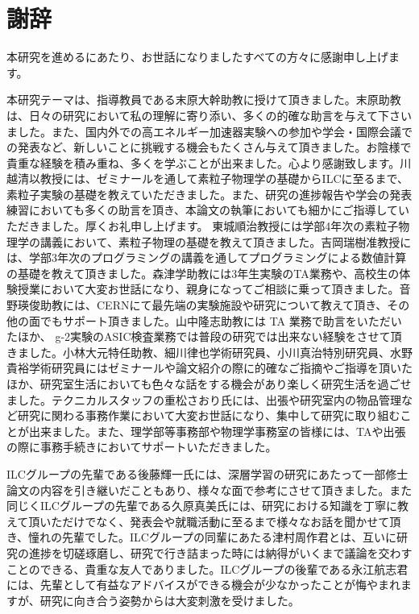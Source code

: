 
\clearpage

\chapter*{謝辞} \label{sec:Acknowledgement}
本研究を進めるにあたり、お世話になりましたすべての方々に感謝申し上げます。

本研究テーマは、指導教員である末原大幹助教に授けて頂きました。末原助教は、日々の研究において私の理解に寄り添い、多くの的確な助言を与えて下さいました。また、国内外での高エネルギー加速器実験への参加や学会・国際会議での発表など、新しいことに挑戦する機会もたくさん与えて頂きました。お陰様で貴重な経験を積み重ね、多くを学ぶことが出来ました。心より感謝致します。川越清以教授には、ゼミナールを通して素粒子物理学の基礎からILCに至るまで、素粒子実験の基礎を教えていただきました。また、研究の進捗報告や学会の発表練習においても多くの助言を頂き、本論文の執筆においても細かにご指導していただきました。厚くお礼申し上げます。
東城順治教授には学部4年次の素粒子物理学の講義において、素粒子物理の基礎を教えて頂きました。吉岡瑞樹准教授には、学部3年次のプログラミングの講義を通してプログラミングによる数値計算の基礎を教えて頂きました。森津学助教には3年生実験のTA業務や、高校生の体験授業において大変お世話になり、親身になってご相談に乗って頂きました。音野瑛俊助教には、CERNにて最先端の実験施設や研究について教えて頂き、その他の面でもサポート頂きました。山中隆志助教には TA 業務で助言をいただいたほか、 g-2実験のASIC検査業務では普段の研究では出来ない経験をさせて頂きました。小林大元特任助教、細川律也学術研究員、小川真治特別研究員、水野貴裕学術研究員にはゼミナールや論文紹介の際に的確なご指摘やご指導を頂いたほか、研究室生活においても色々な話をする機会があり楽しく研究生活を過ごせました。テクニカルスタッフの重松さおり氏には、出張や研究室内の物品管理など研究に関わる事務作業において大変お世話になり、集中して研究に取り組むことが出来ました。また、理学部等事務部や物理学事務室の皆様には、TAや出張の際に事務手続きにおいてサポートいただきました。

ILCグループの先輩である後藤輝一氏には、深層学習の研究にあたって一部修士論文の内容を引き継いだこともあり、様々な面で参考にさせて頂きました。また同じくILCグループの先輩である久原真美氏には、研究における知識を丁寧に教えて頂いただけでなく、発表会や就職活動に至るまで様々なお話を聞かせて頂き、憧れの先輩でした。ILCグループの同輩にあたる津村周作君とは、互いに研究の進捗を切磋琢磨し、研究で行き詰まった時には納得がいくまで議論を交わすことのできる、貴重な友人でありました。ILCグループの後輩である永江航志君には、先輩として有益なアドバイスができる機会が少なかったことが悔やまれますが、研究に向き合う姿勢からは大変刺激を受けました。

